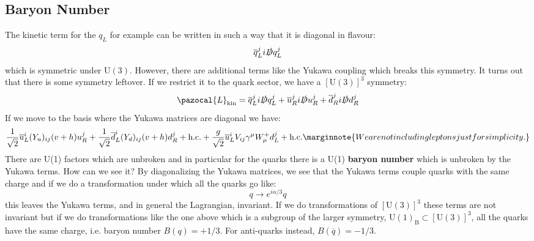 \documentclass[../main.tex]{subfiles}
\begin{document}
\subsection{Baryon Number}
The kinetic term for the $q_L$ for example can be written in such a way that it is diagonal in flavour:
\[
\overline{q}_L^ji\slashed{D}q^j_L
\]
which is symmetric under $\text{U}(3)$. However, there are additional terms like the Yukawa coupling which breaks this symmetry. It turns out that there is some symmetry leftover. If we restrict it to the quark sector, we have a $[\text{U}(3)]^3$ symmetry:
\[
\pazocal{L}_{\text{kin}}=\overline{q}_L^ji\slashed{D}q_L^j+\overline{u}_R^ji\slashed{D}u_R^j+\overline{d}_R^ji\slashed{D}d_R^j
\]
If we move to the basis where the Yukawa matrices are diagonal we have:
\[
\frac{1}{\sqrt{2}}\overline{u}_L^i(Y_u)_{ij}(v+h)u_R^j+\frac{1}{\sqrt{2}}\overline{d}_L^i(Y_d)_{ij}(v+h)d_R^j+\text{h.c.}+\frac{g}{\sqrt{2}}\overline{u}_L^iV_{ij}\gamma^\mu W_\mu^+ d_L^j+\text{h.c.}\marginnote{We are not including leptons just for simplicity.}
\]
There are U(1) factors which are unbroken and in particular for the quarks there is a U(1) \textbf{baryon number} which is unbroken by the Yukawa terms. How can we see it? By diagonalizing the Yukawa matrices, we see that the Yukawa terms couple quarks with the same charge and if we do a transformation under which all the quarks go like:
\[
q\to e^{i\alpha/3}q
\]
this leaves the Yukawa terms, and in general the Lagrangian, invariant. If we do transformations of $[\text{U}(3)]^3$ these terms are not invariant but if we do transformations like the one above which is a subgroup of the larger symmetry,  U$(1)_{\text{B}}\subset[\text{U}(3)]^3$, all the quarks have the same charge, i.e. baryon number $B(q)=+1/3$. For anti-quarks instead, $B(\overline{q})=-1/3.$
\end{document}
